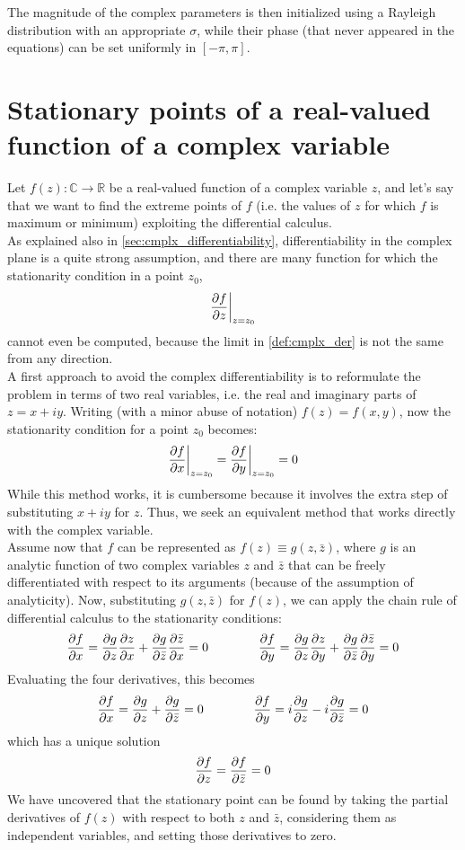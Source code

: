 \documentclass[../main.tex]{subfiles}
\begin{document}
The magnitude of the complex parameters is then initialized using a Rayleigh distribution with an appropriate $\sigma$, while their phase (that never appeared in the equations) can be set uniformly in $[-\pi, \pi]$.


\section{Stationary points of a real-valued function of a complex variable \cite{Messerschmitt_stationary_points}}

Let $f(z):\mathds{C}\to\mathds{R}$ be a real-valued function of a complex variable $z$, and let's say that we want to find the extreme points of $f$ (i.e. the values of $z$ for which $f$ is maximum or minimum) exploiting the differential calculus.\\
As explained also in \ref{sec:cmplx_differentiability}, differentiability in the complex plane is a quite strong assumption, and there are many function for which the stationarity condition in a point $z_0$, 
\[ \pdv{f}{z}\bigg|_{z=z_0} \]
cannot even be computed, because the limit in \ref{def:cmplx_der} is not the same from any direction.\\

A first approach to avoid the complex differentiability is to reformulate the problem in terms of two real variables, i.e. the real and imaginary parts of $z = x+iy$. Writing (with a minor abuse of notation) $f(z) = f(x,y)$, now the stationarity condition for a point $z_0$ becomes:
\[ \pdv{f}{x}\bigg|_{z=z_0} = \pdv{f}{y}\bigg|_{z=z_0} = 0 \]
While this method works, it is cumbersome because it involves the extra step of
substituting $x+iy$ for $z$. Thus, we seek an equivalent method that works directly with
the complex variable.\\

Assume now that $f$ can be represented as $f(z)\equiv g(z, \bar{z})$, where $g$ is an analytic function of two complex variables $z$ and $\bar{z}$ that can be freely differentiated with respect to its arguments (because of the assumption of analyticity). Now, substituting $g(z, \bar{z})$ for $f(z)$, we can apply the chain rule of differential calculus to the stationarity conditions:
\[ \pdv{f}{x} = \pdv{g}{z}\pdv{z}{x} + \pdv{g}{\bar{z}}\pdv{\bar{z}}{x} = 0 \qquad\qquad \pdv{f}{y} = \pdv{g}{z}\pdv{z}{y} + \pdv{g}{\bar{z}}\pdv{\bar{z}}{y} = 0 \]
Evaluating the four derivatives, this becomes
\[ \pdv{f}{x} = \pdv{g}{z} + \pdv{g}{\bar{z}} = 0 \qquad\qquad \pdv{f}{y} = i\pdv{g}{z} -i\pdv{g}{\bar{z}} = 0 \]
which has a unique solution
\[ \pdv{f}{z} = \pdv{f}{\bar{z}} = 0 \]
We have uncovered that the stationary point can be found by taking the partial derivatives
of $f(z)$ with respect to both $z$ and $\bar{z}$, considering them as independent variables, and setting
those derivatives to zero.\\
\end{document}
